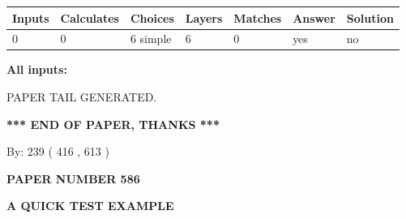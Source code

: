 \documentclass[12pt]{article}
\begin{document}
 
\noindent{}
 
 
   
   
   
   
\noindent\begin{tabular}{|l|l|l|l|l|l|l|}
 \hline
Inputs & Calculates & Choices & Layers & Matches & Answer & Solution \\ \hline
 0  & 
 0  & 
 6
  simple  
  & 
 6  & 
 0  & 
  yes & 
  no 
  \\ \hline
 \end{tabular}
   
   
   
   
\noindent{}
   
   
   
   
\noindent\vspace{0.1in}\hspace{-0.08in} {\textbf{\Large{All inputs: }}}
   
   
   
   
   
   
 \vspace{0.2in}
 
   
   
\vspace{2.0in} PAPER TAIL GENERATED.
   
   
   
   
\vspace{1.0in} 
{\textbf{\large{ *** END OF PAPER, THANKS *** }}} 
   
   
\hspace{1.0in} By: 
 239 ( 416 ,  613 )
   
   
   
   
\newpage 
\setcounter{page}{ 
   586001 } 
   
   
   
   
 {\textbf{ \Large{ PAPER NUMBER  586  }}}
   
   
\vspace{0.2in}
   
   
   
   
   
   
   
   
 \vspace{0.2in}
{\LARGE {\textbf{ A QUICK TEST EXAMPLE}}}
   
\end{document}
